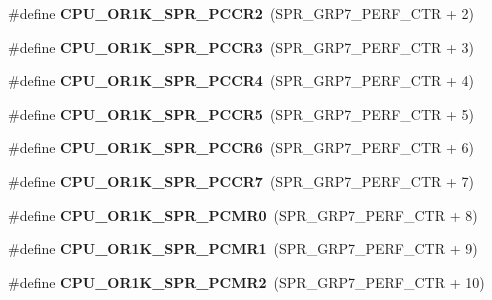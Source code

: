 \begin{DoxyCompactItemize}
\#define {\bfseries C\+P\+U\+\_\+\+O\+R1\+K\+\_\+\+S\+P\+R\+\_\+\+P\+C\+C\+R2}~(S\+P\+R\+\_\+\+G\+R\+P7\+\_\+\+P\+E\+R\+F\+\_\+\+C\+TR + 2)
\item 
\mbox{\label{or1k-utility_8h_a64710a0a3ff939044c1fc5ffccf9c985}} 
\#define {\bfseries C\+P\+U\+\_\+\+O\+R1\+K\+\_\+\+S\+P\+R\+\_\+\+P\+C\+C\+R3}~(S\+P\+R\+\_\+\+G\+R\+P7\+\_\+\+P\+E\+R\+F\+\_\+\+C\+TR + 3)
\item 
\mbox{\label{or1k-utility_8h_a9babcae7dd44d4106569cd6a268727ad}} 
\#define {\bfseries C\+P\+U\+\_\+\+O\+R1\+K\+\_\+\+S\+P\+R\+\_\+\+P\+C\+C\+R4}~(S\+P\+R\+\_\+\+G\+R\+P7\+\_\+\+P\+E\+R\+F\+\_\+\+C\+TR + 4)
\item 
\mbox{\label{or1k-utility_8h_a1c7f5bbfb841c6492e8ceaf810fa1ab7}} 
\#define {\bfseries C\+P\+U\+\_\+\+O\+R1\+K\+\_\+\+S\+P\+R\+\_\+\+P\+C\+C\+R5}~(S\+P\+R\+\_\+\+G\+R\+P7\+\_\+\+P\+E\+R\+F\+\_\+\+C\+TR + 5)
\item 
\mbox{\label{or1k-utility_8h_abf8c772f01ebd585e073118ca0781d3a}} 
\#define {\bfseries C\+P\+U\+\_\+\+O\+R1\+K\+\_\+\+S\+P\+R\+\_\+\+P\+C\+C\+R6}~(S\+P\+R\+\_\+\+G\+R\+P7\+\_\+\+P\+E\+R\+F\+\_\+\+C\+TR + 6)
\item 
\mbox{\label{or1k-utility_8h_afc11e8aa5f7ad5fc0c3f5044c415e1cb}} 
\#define {\bfseries C\+P\+U\+\_\+\+O\+R1\+K\+\_\+\+S\+P\+R\+\_\+\+P\+C\+C\+R7}~(S\+P\+R\+\_\+\+G\+R\+P7\+\_\+\+P\+E\+R\+F\+\_\+\+C\+TR + 7)
\item 
\mbox{\label{or1k-utility_8h_af7e9b4172cff11e68e6cc8cf67ecbb86}} 
\#define {\bfseries C\+P\+U\+\_\+\+O\+R1\+K\+\_\+\+S\+P\+R\+\_\+\+P\+C\+M\+R0}~(S\+P\+R\+\_\+\+G\+R\+P7\+\_\+\+P\+E\+R\+F\+\_\+\+C\+TR + 8)
\item 
\mbox{\label{or1k-utility_8h_a32862ffcbf7a10292598d6d5b8090f84}} 
\#define {\bfseries C\+P\+U\+\_\+\+O\+R1\+K\+\_\+\+S\+P\+R\+\_\+\+P\+C\+M\+R1}~(S\+P\+R\+\_\+\+G\+R\+P7\+\_\+\+P\+E\+R\+F\+\_\+\+C\+TR + 9)
\item 
\mbox{\label{or1k-utility_8h_a99ad742604667fb5af6b458d3de9e33e}} 
\#define {\bfseries C\+P\+U\+\_\+\+O\+R1\+K\+\_\+\+S\+P\+R\+\_\+\+P\+C\+M\+R2}~(S\+P\+R\+\_\+\+G\+R\+P7\+\_\+\+P\+E\+R\+F\+\_\+\+C\+TR + 10)

\end{DoxyCompactItemize}
